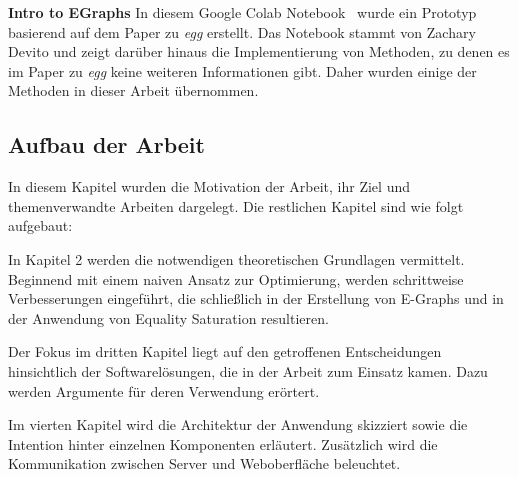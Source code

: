 \noindent\textbf{Intro to EGraphs} In diesem Google Colab Notebook~\cite{devito} wurde ein Prototyp basierend auf dem Paper zu \textit{egg} erstellt.
Das Notebook stammt von Zachary Devito und zeigt darüber hinaus die Implementierung von Methoden, zu denen es im Paper zu \textit{egg} keine weiteren Informationen gibt. 
Daher wurden einige der Methoden in dieser Arbeit übernommen.

\subsection{Aufbau der Arbeit}

In diesem Kapitel wurden die Motivation der Arbeit, ihr Ziel und themenverwandte Arbeiten dargelegt. Die restlichen Kapitel sind wie folgt aufgebaut:

\vspace{-2mm}

In Kapitel 2 werden die notwendigen theoretischen Grundlagen vermittelt. Beginnend mit einem naiven Ansatz zur Optimierung, werden schrittweise Verbesserungen
eingeführt, die schließlich in der Erstellung von E-Graphs und in der Anwendung von Equality Saturation resultieren. 

\vspace{6mm}

\vspace{-2mm}

Der Fokus im dritten Kapitel liegt auf den getroffenen Entscheidungen hinsichtlich der Softwarelösungen, die in der Arbeit zum Einsatz kamen. Dazu werden Argumente für deren Verwendung erörtert.

\vspace{6mm}

\vspace{-2mm}

Im vierten Kapitel wird die Architektur der Anwendung skizziert sowie die Intention hinter einzelnen Komponenten erläutert. Zusätzlich wird die Kommunikation zwischen 
Server und Weboberfläche beleuchtet. 

\vspace{6mm}

\vspace{-2mm}


